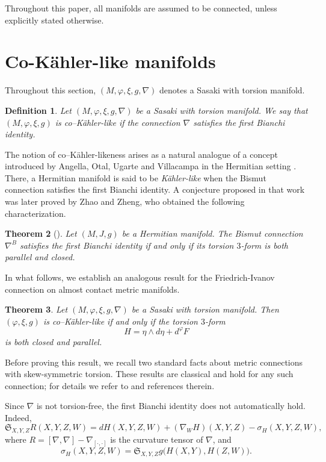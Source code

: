 \documentclass{article}
\newtheorem{thm}{Theorem}[section]
\newtheorem{defn}[thm]{Definition}
\theoremstyle{definition}
\renewcommand{\phi}{\varphi}
\numberwithin{equation}{section}
\begin{document}
Throughout this paper, all manifolds are assumed to be connected, unless explicitly stated otherwise.



\section{Co-K\"ahler-like manifolds}
Throughout this section, \((M, \phi, \xi, g, \nabla)\) denotes a Sasaki with torsion manifold. 


\begin{defn}
Let \((M, \phi, \xi, g, \nabla)\) be a Sasaki with torsion manifold.  
We say that \((M, \phi, \xi, g)\) is \emph{co--K\"ahler-like} if the connection \(\nabla\) satisfies the first Bianchi identity.
\end{defn}

The notion of co--K\"ahler-likeness arises as a natural analogue of a concept introduced by Angella, Otal, Ugarte and Villacampa in the Hermitian setting \cite{AOUV}.  
There, a Hermitian manifold is said to be \emph{K\"ahler-like} when the Bismut connection satisfies the first Bianchi identity.  
A conjecture proposed in that work was later proved by Zhao and Zheng, who obtained the following characterization.

\begin{thm}[\cite{ZZ}] \label{thm:ZZ}
Let \((M, J, g)\) be a Hermitian manifold.  
The Bismut connection \(\nabla^B\) satisfies the first Bianchi identity if and only if its torsion \(3\)-form is both parallel and closed.
\end{thm}

In what follows, we establish an analogous result for the Friedrich-Ivanov connection on almost contact metric manifolds.

\begin{thm} \label{thm:CKL}
Let \((M, \phi, \xi, g, \nabla)\) be a Sasaki with torsion manifold. Then $(\phi, \xi, g)$ is co--K\"ahler-like if and only if the torsion \(3\)-form
\[
H = \eta \wedge d\eta + d^{\phi} F
\]
is both closed and parallel.
\end{thm}

Before proving this result, we recall two standard facts about metric connections with skew-symmetric torsion.  
These results are classical and hold for any such connection; for details we refer to \cite{AFF, IS} and references therein.

\medskip

Since \(\nabla\) is not torsion-free, the first Bianchi identity does not automatically hold.  
Indeed,
\begin{equation} \label{eqn:1bianchi}
\mathfrak{S}_{X,Y,Z} R(X,Y,Z,W)
    = dH(X,Y,Z,W)
    + (\nabla_W H)(X,Y,Z)
    - \sigma_H(X,Y,Z,W),
\end{equation}
where \(R=[\nabla,\nabla]-\nabla_{[\cdot,\cdot]}\) is the curvature tensor of \(\nabla\), and
\begin{equation} \label{eqn:sigma}
  \sigma_H(X,Y,Z,W)
    = \mathfrak{S}_{X,Y,Z}
      g\big(H(X,Y), H(Z,W)\big).  
\end{equation}
\end{document}
